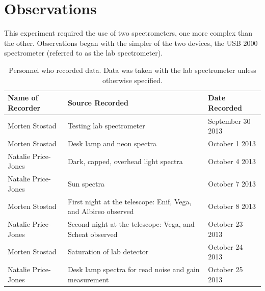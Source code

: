 \documentclass[a4paper,12pt]{article}
\begin{document}
\section{Observations}
\label{sec:observations}
This experiment required the use of two spectrometers, one more complex than the other. Observations began with the simpler of the two devices, the USB 2000 spectrometer (referred to as the lab spectrometer).
\begin{table}[!htbp]
  \centering
  \begin{tabular}{p{1.5in}||p{2.5in}||l}
    Name of Recorder & Source Recorded & Date Recorded\\
    \hline
    Morten Stostad & Testing lab spectrometer & September 30 2013\\
    \hline
    Morten Stostad & Desk lamp and neon spectra & October 1 2013\\
    \hline
    Natalie Price-Jones & Dark, capped, overhead light spectra & October 4 2013\\
    \hline
    Natalie Price-Jones & Sun spectra & October 7 2013\\
    \hline
    Morten Stostad & First night at the telescope: Enif, Vega, and Albireo observed & October 8 2013\\
    \hline
    Natalie Price-Jones & Second night at the telescope: Vega, and Scheat observed & October 23 2013\\
    \hline
    Morten Stostad & Saturation of lab detector & October 24 2013\\
    \hline
    Natalie Price-Jones & Desk lamp spectra for read noise and gain measurement & October 25 2013\\
    \end{tabular}
    \caption{Personnel who recorded data. Data was taken with the lab spectrometer unless otherwise specified.}
    \label{tab:datatable}
\end{table}
\end{document}

